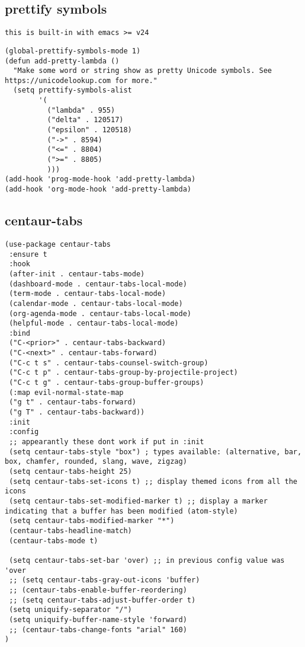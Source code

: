 \documentclass[11pt]{article}
\begin{document}
\subsection*{prettify symbols}
\label{sec:org97239cc}

\begin{verbatim}
this is built-in with emacs >= v24
\end{verbatim}

\begin{verbatim}
(global-prettify-symbols-mode 1)
(defun add-pretty-lambda ()
  "Make some word or string show as pretty Unicode symbols. See https://unicodelookup.com for more."
  (setq prettify-symbols-alist
        '(
          ("lambda" . 955)
          ("delta" . 120517)
          ("epsilon" . 120518)
          ("->" . 8594)
          ("<=" . 8804)
          (">=" . 8805)
          )))
(add-hook 'prog-mode-hook 'add-pretty-lambda)
(add-hook 'org-mode-hook 'add-pretty-lambda)
\end{verbatim}

\subsection*{centaur-tabs}
\label{sec:orga0721c8}

\begin{verbatim}
(use-package centaur-tabs
 :ensure t
 :hook
 (after-init . centaur-tabs-mode)
 (dashboard-mode . centaur-tabs-local-mode)
 (term-mode . centaur-tabs-local-mode)
 (calendar-mode . centaur-tabs-local-mode)
 (org-agenda-mode . centaur-tabs-local-mode)
 (helpful-mode . centaur-tabs-local-mode)
 :bind
 ("C-<prior>" . centaur-tabs-backward)
 ("C-<next>" . centaur-tabs-forward)
 ("C-c t s" . centaur-tabs-counsel-switch-group)
 ("C-c t p" . centaur-tabs-group-by-projectile-project)
 ("C-c t g" . centaur-tabs-group-buffer-groups)
 (:map evil-normal-state-map
 ("g t" . centaur-tabs-forward)
 ("g T" . centaur-tabs-backward))
 :init
 :config
 ;; appearantly these dont work if put in :init
 (setq centaur-tabs-style "box") ; types available: (alternative, bar, box, chamfer, rounded, slang, wave, zigzag)
 (setq centaur-tabs-height 25)
 (setq centaur-tabs-set-icons t) ;; display themed icons from all the icons
 (setq centaur-tabs-set-modified-marker t) ;; display a marker indicating that a buffer has been modified (atom-style)
 (setq centaur-tabs-modified-marker "*")
 (centaur-tabs-headline-match)
 (centaur-tabs-mode t)

 (setq centaur-tabs-set-bar 'over) ;; in previous config value was 'over
 ;; (setq centaur-tabs-gray-out-icons 'buffer)
 ;; (centaur-tabs-enable-buffer-reordering)
 ;; (setq centaur-tabs-adjust-buffer-order t)
 (setq uniquify-separator "/")
 (setq uniquify-buffer-name-style 'forward)
 ;; (centaur-tabs-change-fonts "arial" 160)
)
\end{verbatim}
\end{document}
